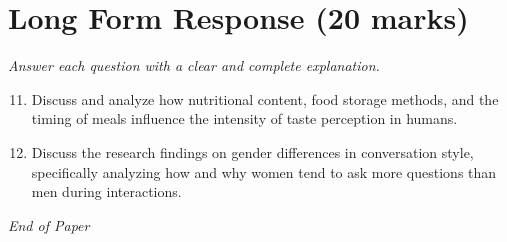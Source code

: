 \documentclass[12pt]{article}
\begin{document}
\section*{Long Form Response (20 marks)}
\textit{Answer each question with a clear and complete explanation.}
\begin{enumerate}[label=\arabic*.]
\setcounter{enumi}{10}
\item Discuss and analyze how nutritional content, food storage methods, and the timing of meals influence the intensity of taste perception in humans.
\item Discuss the research findings on gender differences in conversation style, specifically analyzing how and why women tend to ask more questions than men during interactions.
\end{enumerate}

\vfill
\noindent\textit{End of Paper}
\end{document}
